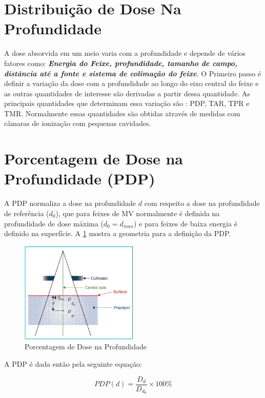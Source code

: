 \documentclass[11pt,a4paper]{article}
\begin{document}
\section{Distribuição de Dose Na Profundidade}

	A dose absorvida em um meio varia com a profundidade e depende de vários fatores como: \textit{\textbf{Energia do Feixe, profundidade, tamanho de campo, distância até a fonte e sistema de colimação do feixe}}. O Primeiro passo é definir a variação da dose com a profundidade ao longo do eixo central do feixe e as outras quantidades de interesse são derivadas a partir dessa quantidade. As principais quantidades que determinam essa variação são : PDP, TAR, TPR e TMR. Normalmente essas quantidades são obtidas através de medidas com câmaras de ionização com pequenas cavidades. 

	\section{Porcentagem de Dose na Profundidade (PDP)}

	A PDP normaliza a dose na profundidade $d$ com respeito a dose na profundidade de referência ($d_0$), que para feixes de MV normalmente é definida na profundidade de dose máxima ($d_0 = d_{max}$) e para feixes de baixa energia é definido na superfície. A \ref{fig:pdp} mostra a geometria para a definição da PDP.

		\begin{figure}[h]
			\centering
			\includegraphics[width=0.5\textwidth]{Imagens/pdp.JPG}
			\caption{Porcentagem de Dose na Profundidade}
			\label{fig:pdp}
		\end{figure}

	A PDP é dada então pela seguinte equação:

		\begin{equation}
			PDP(d) = \frac{D_d}{D_{d_0}} \times 100 \%
		\end{equation}
\end{document}
